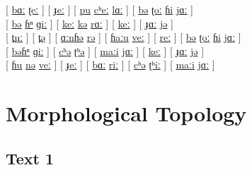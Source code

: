 \documentclass[17pt]{extarticle}
\begin{document}
[ \underline{bɑː} \underline{ʈeː} ] [ \underline{ɟeː} ] [ \underline{pu} \underline{cʰeː} \underline{lɑː} ] [ \underline{bə} \underline{ʈoː} \underline{ɦi} \underline{jɑː} ]\\

[ \underline{bə} \underline{ɦⁿ} \underline{ɡiː} ] [ \underline{keː} \underline{kə} \underline{rɑː} ] [ \underline{keː} ] [ \underline{ɟɑː} \underline{jə} ]\\

[ \underline{t̪uː} ] [ \underline{t̪ə} ] [ \underline{ɑːnɦə} \underline{rə} ] [ \underline{ɦaːu} \underline{veː} ] [ \underline{reː} ] [ \underline{bə} \underline{ʈoː} \underline{ɦi} \underline{jɑː} ]\\

[ \underline{bəɦⁿ} \underline{ɡiː} ] [ \underline{cʰə} \underline{ʈʰə} ] [ \underline{maːi} \underline{jɑː} ] [ \underline{keː} ] [ \underline{ɟɑː} \underline{jə} ]\\

[ \underline{ɦu} \underline{nə} \underline{veː} ] [ \underline{ɟeː} ] [ \underline{bɑː} \underline{riː} ] [ \underline{cʰə} \underline{ʈʰiː} ] [ \underline{maːi} \underline{jɑː} ]\\

\section*{\textbf{Morphological Topology}}

\subsection*{Text 1}
\end{document}
